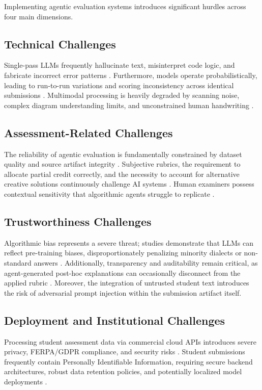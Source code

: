 \documentclass[11pt,a4paper]{article}
\begin{document}
Implementing agentic evaluation systems introduces significant hurdles across four main dimensions.

\subsection{Technical Challenges}
Single-pass LLMs frequently hallucinate text, misinterpret code logic, and fabricate incorrect error patterns \cite{P001, P003, P024}. Furthermore, models operate probabilistically, leading to run-to-run variations and scoring inconsistency across identical submissions \cite{P003, P028}. Multimodal processing is heavily degraded by scanning noise, complex diagram understanding limits, and unconstrained human handwriting \cite{P004, P016, P026}.

\subsection{Assessment-Related Challenges}
The reliability of agentic evaluation is fundamentally constrained by dataset quality and source artifact integrity \cite{P009, P022}. Subjective rubrics, the requirement to allocate partial credit correctly, and the necessity to account for alternative creative solutions continuously challenge AI systems \cite{P008, P014, P019}. Human examiners possess contextual sensitivity that algorithmic agents struggle to replicate \cite{P003, P014}.

\subsection{Trustworthiness Challenges}
Algorithmic bias represents a severe threat; studies demonstrate that LLMs can reflect pre-training biases, disproportionately penalizing minority dialects or non-standard answers \cite{P008, P019, P029}. Additionally, transparency and auditability remain critical, as agent-generated post-hoc explanations can occasionally disconnect from the applied rubric \cite{P015, P024}. Moreover, the integration of untrusted student text introduces the risk of adversarial prompt injection within the submission artifact itself.

\subsection{Deployment and Institutional Challenges}
Processing student assessment data via commercial cloud APIs introduces severe privacy, FERPA/GDPR compliance, and security risks \cite{P009, P011, P019, P024}. Student submissions frequently contain Personally Identifiable Information, requiring secure backend architectures, robust data retention policies, and potentially localized model deployments \cite{P020, P022, P030}.
\end{document}

